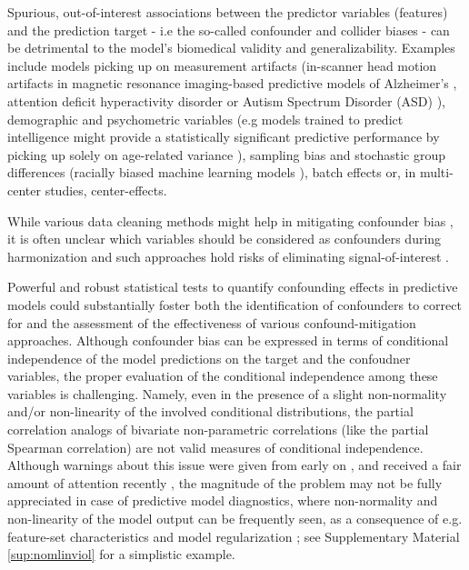 \documentclass{article}
\begin{document}
Spurious, out-of-interest associations between the predictor variables (features) and the prediction target - i.e the so-called confounder and collider biases \citep{prosperi2020causal} - can be detrimental to the model's biomedical validity and generalizability. Examples include models picking up on measurement artifacts (in-scanner head motion artifacts in magnetic resonance imaging-based predictive models of Alzheimer's \citep{rao2017predictive}, attention deficit hyperactivity disorder \citep{eloyan2012automated, couvy2016head} or Autism Spectrum Disorder (ASD) \citep{gotts2013perils, spisak2014voxel, spisak2019optimal}), demographic and psychometric variables (e.g models trained to predict intelligence \citep{ cole2012global, he2020deep} might provide a statistically significant predictive performance by picking up solely on age-related variance \citep{dubois2018distributed, lohmann2021predicting}), sampling bias and stochastic group differences (racially biased machine learning models \citep{ obermeyer2019dissecting, lwowski2021risk}), batch effects or, in multi-center studies, center-effects.

While various data cleaning methods might help in mitigating confounder bias \citep{rao2017predictive, dukart2011age, spisak2014voxel, abdulkadir2014reduction, rao2017predictive, johnson2007adjusting}, it is often unclear which variables should be considered as confounders during harmonization and such approaches hold risks of eliminating signal-of-interest \citep{wachinger2021detect}.

Powerful and robust statistical tests to quantify confounding effects in predictive models could substantially foster both the identification of confounders to correct for and the assessment of the effectiveness of various confound-mitigation approaches. Although confounder bias can be expressed in terms of conditional independence of the model predictions on the target and the confoudner variables, the proper evaluation of the conditional independence among these variables is challenging. Namely, even in the presence of a slight non-normality and/or non-linearity of the involved conditional distributions, the partial correlation analogs of bivariate non-parametric correlations (like the partial Spearman correlation) are not valid measures of conditional independence. Although warnings about this issue were given from early on \citep{korn1984ranges}, and received a fair amount of attention recently \citep{bergsma2010nonparametric, candes2016panning, peters2016causal,  shah2020hardness, berrett2020conditional}, the magnitude of the problem may not be fully appreciated in case of predictive model diagnostics, where non-normality and non-linearity of the model output can be frequently seen, as a consequence of e.g. feature-set characteristics and model regularization \citep{garcia2009study, kristensen2017whole}; see Supplementary Material \ref{sup:nomlinviol} for a simplistic example.
\end{document}
